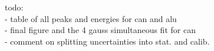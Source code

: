 todo: \\
- table of all peaks and energies for can and alu \\
- final figure and the 4 gauss simultaneous fit for can \\
- comment on splitting uncertainties into stat. and calib. \\



